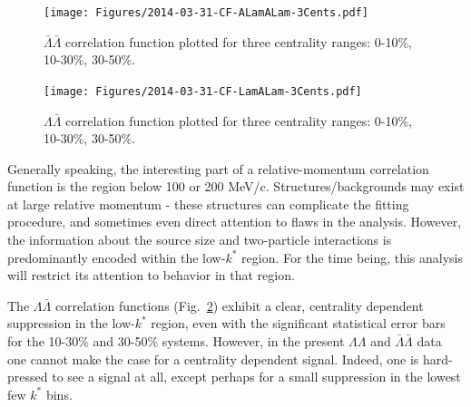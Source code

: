 \begin{figure}[hbtp]
\texttt{[image: Figures/2014-03-31-CF-ALamALam-3Cents.pdf]}
\caption[$\bar{\Lambda}\bar{\Lambda}$ correlation function for three centrality ranges]{$\bar{\Lambda}\bar{\Lambda}$ correlation function plotted for three centrality ranges: 0-10\%, 10-30\%, 30-50\%.}
\label{fig:CFALamALam3Cents}
\end{figure}

\begin{figure}[hbtp]
\texttt{[image: Figures/2014-03-31-CF-LamALam-3Cents.pdf]}
\caption[$\Lambda\bar{\Lambda}$ correlation function for three centrality ranges]{$\Lambda\bar{\Lambda}$ correlation function plotted for three centrality ranges: 0-10\%, 10-30\%, 30-50\%.}
\label{fig:CFLamALam3Cents}
\end{figure}

Generally speaking, the interesting part of a relative-momentum correlation function is the region below 100 or 200 MeV/c.  Structures/backgrounds may exist at large relative momentum - these structures can complicate the fitting procedure, and sometimes even direct attention to flaws in the analysis.  However, the information about the source size and two-particle interactions is predominantly encoded within the low-$k^*$ region.  For the time being, this analysis will restrict its attention to behavior in that region.

The $\Lambda\bar{\Lambda}$ correlation functions (Fig.\ \ref{fig:CFLamALam3Cents}) exhibit a clear, centrality dependent suppression in the low-$k^*$ region, even with the significant statistical error bars for the 10-30\% and 30-50\% systems.  However, in the present $\Lambda\Lambda$ and $\bar{\Lambda}\bar{\Lambda}$ data one cannot make the case for a centrality dependent signal.  Indeed, one is hard-pressed to see a signal at all, except perhaps for a small suppression in the lowest few $k^*$ bins.  

